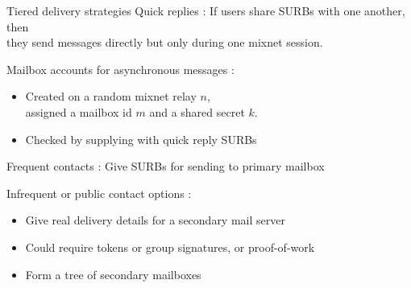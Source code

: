 \documentclass[fleqn,xcolor={usenames,dvipsnames}]{beamer}
\begin{document}
\begin{frame}{Tiered delivery strategies}
Quick replies :
If users share SURBs with one another, then \\ %
\hspace*{2pt} they send messages directly but only during one mixnet session.

\medskip

Mailbox accounts for asynchronous messages : 
\begin{itemize}
\item Created on a random mixnet relay $n$, \\
 \hspace*{2pt} assigned a mailbox id $m$ and a shared secret $k$.
\item Checked by supplying with quick reply SURBs
\end{itemize}

\medskip
\pause

Frequent contacts : Give SURBs for sending to primary mailbox %

\medskip

Infrequent or public contact options : 
\begin{itemize}
\item Give real delivery details for a secondary mail server
\item Could require tokens or group signatures, or proof-of-work
\item Form a tree of secondary mailboxes
\end{itemize}


\end{frame}
\end{document}
